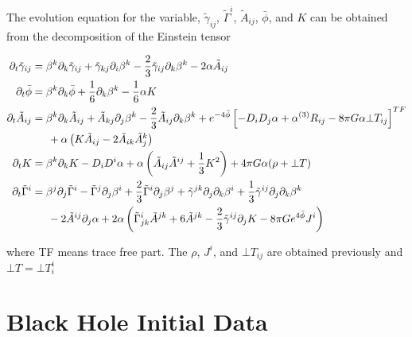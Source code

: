 \documentclass[%
 reprint,
 amsmath,amssymb,
 aps,
]{revtex4-1}
\begin{document}
The evolution equation for the variable, $\tilde{\gamma}_{ij}$, $\tilde{\Gamma}^i$, $\tilde{A}_{ij}$, $\bar{\phi}$, and $K$ can be obtained from the decomposition of the Einstein tensor
\begin{widetext}
\begin{align}
\partial_t \tilde{\gamma}_{ij} &= \beta^k \partial_k \tilde{\gamma}_{ij} + \tilde{\gamma}_{kj} \partial_i \beta^k -\frac{2}{3} \tilde{\gamma}_{ij} \partial_k \beta^k - 2 \alpha \tilde{A}_{ij} \\
\partial_t \bar{\phi} &= \beta^k \partial_k \bar{\phi} + \frac{1}{6} \partial_k \beta^k - \frac{1}{6} \alpha K \\
\partial_t \tilde{A}_{ij} &= \beta^k \partial_k \tilde{A}_{ij} + \tilde{A}_{kj} \partial_j \beta^k -\frac{2}{3} \tilde{A}_{ij} \partial_k \beta^k + e^{-4 \bar{\phi}} \left[ - D_i D_j \alpha + \alpha ^{(3)}R_{ij} - 8 \pi G \alpha \bot T_{ij}\right]^{TF} \nonumber \\
				&\indent + \alpha \left( K \tilde{A}_{ij} - 2 \tilde{A}_{ik} \tilde{A}_{j}^k \right) \\
\partial_t K &= \beta^k \partial_k K - D_i D^i \alpha + \alpha \left(\tilde{A}_{ij} \tilde{A}^{ij} + \frac{1}{3} K^2 \right) + 4 \pi G \alpha ( \rho + \bot T) \\
\partial_t \tilde{\Gamma}^i &= \beta^j \partial_j \tilde{\Gamma}^i - \tilde{\Gamma}^j \partial_j \beta^i+ \frac{2}{3} \tilde{\Gamma}^i \partial_j \beta^j + \tilde{\gamma}^{jk} \partial_j \partial_k \beta^i + \frac{1}{3} \tilde{\gamma}^{ij} \partial_j \partial_k \beta^k \nonumber \\
					&\indent - 2 \tilde{A}^{ij} \partial_j \alpha + 2 \alpha \left(\tilde{\Gamma}_{jk}^i \tilde{A}^{jk} + 6 \tilde{A}^{jk} -\frac{2}{3} \tilde{\gamma}^{ij} \partial_j K - 8 \pi G e^{4 \bar{\phi}} J^i \right)
\end{align}
\end{widetext}
where TF means trace free part. The $\rho$, $J^i$, and $\bot T_{ij}$ are obtained previously and $\bot T = \bot T_i^i$

\section{Black Hole Initial Data}



\end{document}
